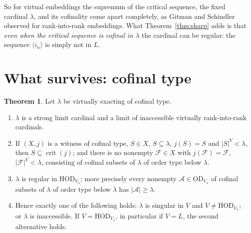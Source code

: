 \documentclass[11pt,letterpaper]{article}
\theoremstyle{definition}
\newtheorem{theorem}[definition]{Theorem}
\numberwithin{equation}{section}
\newcommand{\HOD}{\mathrm{HOD}}
\newcommand{\OD}{\mathrm{OD}}
\newcommand{\crit}{\operatorname{crit}}
\begin{document}
So for virtual embeddings the supremum of the critical sequence, the fixed cardinal $\lambda$, and its cofinality come apart completely, as Gitman and Schindler observed for rank-into-rank embeddings. What Theorem~\ref{thm:sharp} adds is that \emph{even when the critical sequence is cofinal in $\lambda$} the cardinal can be regular: the sequence $\langle i_n\rangle$ is simply not in $L$.

\section{What survives: cofinal type}\label{sec:cofinal}

\begin{theorem}\label{thm:cofinal}
Let $\lambda$ be virtually exacting of cofinal type.
\begin{enumerate}
\item $\lambda$ is a strong limit cardinal and a limit of inaccessible virtually rank-into-rank cardinals.
\item If $(X,j)$ is a witness of cofinal type, $S\in X$, $S\subseteq\lambda$, $j(S)=S$ and $|S|^V<\lambda$, then $S\subseteq\crit(j)$; and there is no nonempty $\mathcal F\in X$ with $j(\mathcal F)=\mathcal F$, $|\mathcal F|^V<\lambda$, consisting of cofinal subsets of $\lambda$ of order type below $\lambda$.
\item $\lambda$ is regular in $\HOD_{V_\lambda}$; more precisely every nonempty $\mathcal A\in\OD_{V_\lambda}$ of cofinal subsets of $\lambda$ of order type below $\lambda$ has $|\mathcal A|\ge\lambda$.
\item Hence exactly one of the following holds: $\lambda$ is singular in $V$ and $V\ne\HOD_{V_\lambda}$; or $\lambda$ is inaccessible. If $V=\HOD_{V_\lambda}$, in particular if $V=L$, the second alternative holds.
\end{enumerate}
\end{theorem}
\end{document}

